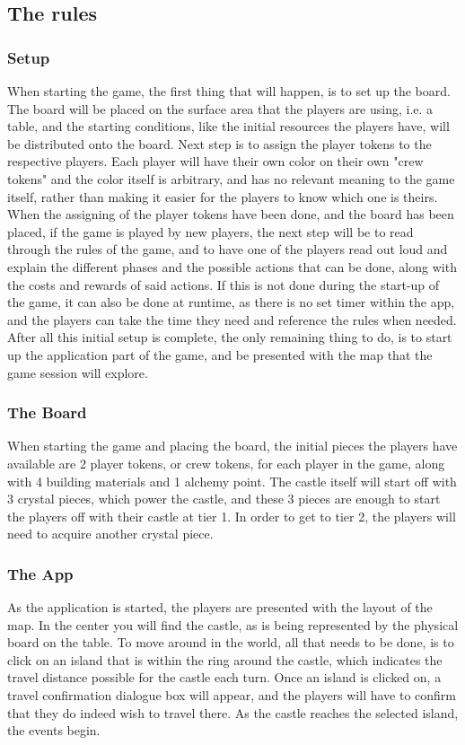 \subsection{The rules}
\subsubsection{Setup}

When starting the game, the first thing that will happen, is to set up the board. The board will be placed on the surface area that the players are using, i.e. a table, and the starting conditions, like the initial resources the players have, will be distributed onto the board. Next step is to assign the player tokens to the respective players. Each player will have their own color on their own "crew tokens" and the color itself is arbitrary, and has no relevant meaning to the game itself, rather than making it easier for the players to know which one is theirs.
When the assigning of the player tokens have been done, and the board has been placed, if the game is played by new players, the next step will be to read through the rules of the game, and to have one of the players read out loud and explain the different phases and the possible actions that can be done, along with the costs and rewards of said actions. If this is not done during the start-up of the game, it can also be done at runtime, as there is no set timer within the app, and the players can take the time they need and reference the rules when needed.
After all this initial setup is complete, the only remaining thing to do, is to start up the application part of the game, and be presented with the map that the game session will explore. 

\subsubsection{The Board}
When starting the game and placing the board, the initial pieces the players have available are 2 player tokens, or crew tokens, for each player in the game, along with 4 building materials and 1 alchemy point. The castle itself will start off with 3 crystal pieces, which power the castle, and these 3 pieces are enough to start the players off with their castle at tier 1. In order to get to tier 2, the players will need to acquire another crystal piece.


\subsubsection{The App}
As the application is started, the players are presented with the layout of the map. In the center you will find the castle, as is being represented by the physical board on the table. To move around in the world, all that needs to be done, is to click on an island that is within the ring around the castle, which indicates the travel distance possible for the castle each turn. Once an island is clicked on, a travel confirmation dialogue box will appear, and the players will have to confirm that they do indeed wish to travel there. As the castle reaches the selected island, the events begin. 


